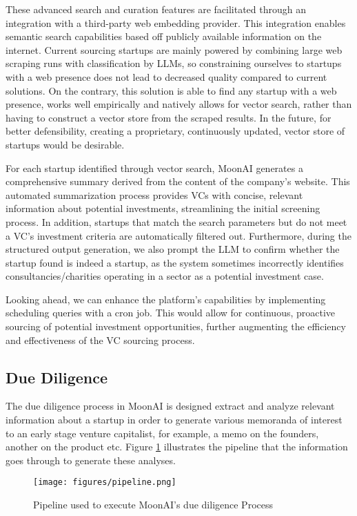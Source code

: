 \documentclass[a4paper, oneside]{discothesis}
\begin{document}
These advanced search and curation features are facilitated through an integration with a third-party web embedding provider. This integration enables semantic search capabilities based off publicly available information on the internet. Current sourcing startups are mainly powered by combining large web scraping runs with classification by LLMs, so constraining ourselves to startups with a web presence does not lead to decreased quality compared to current solutions. On the contrary, this solution is able to find any startup with a web presence, works well empirically and natively allows for vector search, rather than having to construct a vector store from the scraped results. In the future, for better defensibility, creating a proprietary, continuously updated, vector store of startups would be desirable. 

For each startup identified through vector search, MoonAI generates a comprehensive summary derived from the content of the company's website. This automated summarization process provides VCs with concise, relevant information about potential investments, streamlining the initial screening process. In addition, startups that match the search parameters but do not meet a VC's investment criteria are automatically filtered out. Furthermore, during the structured output generation, we also prompt the LLM to confirm whether the startup found is indeed a startup, as the system sometimes incorrectly identifies consultancies/charities operating in a sector as a potential investment case. 

Looking ahead, we can enhance the platform's capabilities by implementing scheduling queries with a cron job. This would allow for continuous, proactive sourcing of potential investment opportunities, further augmenting the efficiency and effectiveness of the VC sourcing process.

\subsection{Due Diligence}

The due diligence process in MoonAI is designed extract and analyze relevant information about a startup in order to generate various memoranda of interest to an early stage venture capitalist, for example, a memo on the founders, another on the product etc. Figure \ref{fig:due_diligence_arch} illustrates the pipeline that the information goes through to generate these analyses.

\begin{figure}[h]
    \centering
    \texttt{[image: figures/pipeline.png]}
    \caption{Pipeline used to execute MoonAI's due diligence Process}
    \label{fig:due_diligence_arch}
\end{figure}
\end{document}
